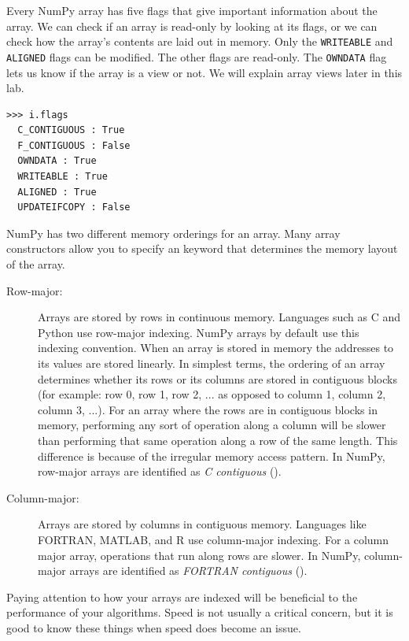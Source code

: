 Every NumPy array has five flags that give important information about the array.
We can check if an array is read-only by looking at its flags, or we can check how the array's contents are laid out in memory.
Only the \texttt{WRITEABLE} and \texttt{ALIGNED} flags can be modified.  The other flags are read-only.  
The \texttt{OWNDATA} flag lets us know if the array is a view or not.
We will explain array views later in this lab.
\begin{lstlisting}
>>> i.flags
  C_CONTIGUOUS : True
  F_CONTIGUOUS : False
  OWNDATA : True
  WRITEABLE : True
  ALIGNED : True
  UPDATEIFCOPY : False
\end{lstlisting}
NumPy has two different memory orderings for an array.
Many array constructors allow you to specify an  keyword that determines the memory layout of the array.
\begin{description}
\item[Row-major:] Arrays are stored by rows in continuous memory.
Languages such as C and Python use row-major indexing.
NumPy arrays by default use this indexing convention.
When an array is stored in memory the addresses to its values are stored linearly.
In simplest terms, the ordering of an array determines whether its rows or its columns are stored in contiguous blocks (for example: row 0, row 1, row 2, ... as opposed to column 1, column 2, column 3, ...).
For an array where the rows are in contiguous blocks in memory, performing any sort of operation along a column will be slower than performing that same operation along a row of the same length.
This difference is because of the irregular memory access pattern.
In NumPy, row-major arrays are identified as \emph{C contiguous} ().
\item[Column-major:] Arrays are stored by columns in contiguous memory.
Languages like FORTRAN, MATLAB, and R use column-major indexing.
For a column major array, operations that run along rows are slower.
In NumPy, column-major arrays are identified as \emph{FORTRAN contiguous} ().
\end{description}
Paying attention to how your arrays are indexed will be beneficial to the performance of your algorithms.
Speed is not usually a critical concern, but it is good to know these things when speed does become an issue.
 

